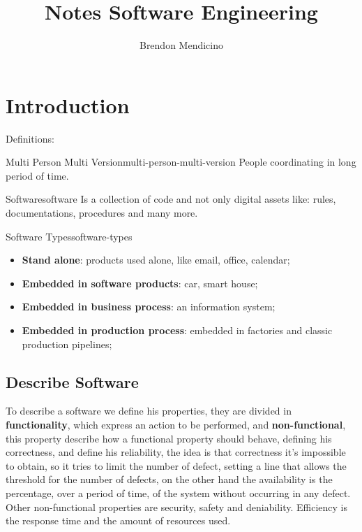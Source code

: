 \documentclass[12pt]{article}
\title{Notes Software Engineering}
\author{Brendon Mendicino}
\begin{document}
\maketitle
\newpage
\tableofcontents
\newpage



\section{Introduction}
Definitions:
\begin{definition}{Multi Person Multi Version}{multi-person-multi-version}
    People coordinating in long period of time.
\end{definition}
\begin{definition}{Software}{software}
    Is a collection of code and not only digital assets like: rules, documentations, procedures and many more. 
\end{definition}
\begin{definition}{Software Types}{software-types}
    \begin{itemize}
        \item \textbf{Stand alone}: products used alone, like email, office, calendar;
        \item \textbf{Embedded in software products}: car, smart house;
        \item \textbf{Embedded in business process}: an information system;
        \item \textbf{Embedded in production process}: embedded in factories and classic production pipelines;
    \end{itemize}
\end{definition}

\subsection{Describe Software}
To describe a software we define his properties, they are divided in \textbf{functionality}, which express an action to be performed, and \textbf{non-functional}, this property describe how a functional property should behave, defining his correctness, and define his reliability, the idea is that correctness it's impossible to obtain, so it tries to limit the number of defect, setting a line that allows the threshold for the number of defects, on the other hand the availability is the percentage, over a period of time, of the system without occurring in any defect. Other non-functional properties are security, safety and deniability. Efficiency is the response time and the amount of resources used.
\end{document}
